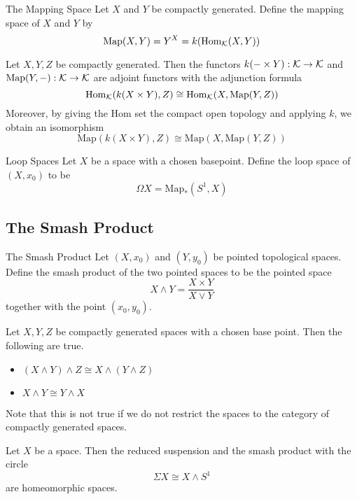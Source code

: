 \documentclass[a4paper]{article}
\begin{document}
\begin{defn}{The Mapping Space}{} Let $X$ and $Y$ be compactly generated. Define the mapping space of $X$ and $Y$ by $$\text{Map}(X,Y)=Y^X=k(\operatorname{Hom}_{\mathcal{K}}(X,Y))$$
\end{defn}

\begin{thm}{}{} Let $X,Y,Z$ be compactly generated. Then the functors $k(-\times Y):\mathcal{K}\to\mathcal{K}$ and $\text{Map}(Y,-):\mathcal{K}\to\mathcal{K}$ are adjoint functors with the adjunction formula $$\operatorname{Hom}_{\mathcal{K}}(k(X\times Y),Z)\cong\operatorname{Hom}_{\mathcal{K}}(X,\text{Map}(Y,Z))$$ Moreover, by giving the Hom set the compact open topology and applying $k$, we obtain an isomorphism $$\text{Map}(k(X\times Y),Z)\cong\text{Map}(X,\text{Map}(Y,Z))$$
\end{thm}

\begin{defn}{Loop Spaces}{} Let $X$ be a space with a chosen basepoint. Define the loop space of $(X,x_0)$ to be $$\Omega X=\text{Map}_\ast(S^1,X)$$
\end{defn}

\subsection{The Smash Product}
\begin{defn}{The Smash Product}{} Let $(X,x_0)$ and $(Y,y_0)$ be pointed topological spaces. Define the smash product of the two pointed spaces to be the pointed space $$X\wedge Y=\frac{X\times Y}{X\vee Y}$$ together with the point $(x_0,y_0)$. 
\end{defn}

\begin{prp}{}{} Let $X,Y,Z$ be compactly generated spaces with a chosen base point. Then the following are true. 
\begin{itemize}
\item $(X\wedge Y)\wedge Z\cong X\wedge(Y\wedge Z)$
\item $X\wedge Y\cong Y\wedge X$
\end{itemize}
\end{prp}

Note that this is not true if we do not restrict the spaces to the category of compactly generated spaces. 

\begin{lmm}{}{} Let $X$ be a space. Then the reduced suspension and the smash product with the circle $$\Sigma X\cong X\wedge S^1$$ are homeomorphic spaces. 
\end{lmm}
\end{document}
